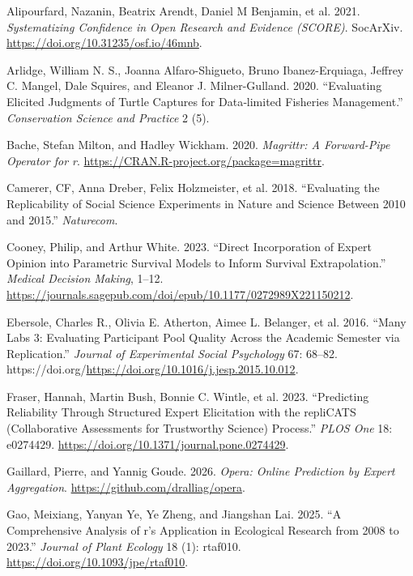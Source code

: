 \documentclass[
  11pt,
  a4paper,
]{article}
\newlength{\cslhangindent}
\newenvironment{CSLReferences}[2] %
 {\begin{list}{}{%
  \setlength{\itemindent}{0pt}
  \setlength{\leftmargin}{0pt}
  \setlength{\parsep}{0pt}
  \ifodd #1
   \setlength{\leftmargin}{\cslhangindent}
   \setlength{\itemindent}{-1\cslhangindent}
  \fi
  \setlength{\itemsep}{#2\baselineskip}}}
 {\end{list}}
\begin{document}
\protect{}\label{refs}
\begin{CSLReferences}{1}{1}
Alipourfard, Nazanin, Beatrix Arendt, Daniel M Benjamin, et al. 2021.
\emph{Systematizing Confidence in Open Research and Evidence (SCORE)}.
SocArXiv. \url{https://doi.org/10.31235/osf.io/46mnb}.

Arlidge, William N. S., Joanna Alfaro-Shigueto, Bruno Ibanez-Erquiaga,
Jeffrey C. Mangel, Dale Squires, and Eleanor J. Milner-Gulland. 2020.
{``Evaluating Elicited Judgments of Turtle Captures for Data‐limited
Fisheries Management.''} \emph{Conservation Science and Practice} 2 (5).

Bache, Stefan Milton, and Hadley Wickham. 2020. \emph{Magrittr: A
Forward-Pipe Operator for r}.
\url{https://CRAN.R-project.org/package=magrittr}.

Camerer, CF, Anna Dreber, Felix Holzmeister, et al. 2018. {``Evaluating
the Replicability of Social Science Experiments in Nature and Science
Between 2010 and 2015.''} \emph{Naturecom}.

Cooney, Philip, and Arthur White. 2023. {``Direct Incorporation of
Expert Opinion into Parametric Survival Models to Inform Survival
Extrapolation.''} \emph{Medical Decision Making}, 1--12.
\url{https://journals.sagepub.com/doi/epub/10.1177/0272989X221150212}.

{Ebersole, Charles R., Olivia E. Atherton, Aimee L. Belanger, et al.}
2016. {``Many Labs 3: Evaluating Participant Pool Quality Across the
Academic Semester via Replication.''} \emph{Journal of Experimental
Social Psychology} 67: 68--82.
https://doi.org/\url{https://doi.org/10.1016/j.jesp.2015.10.012}.

Fraser, Hannah, Martin Bush, Bonnie C. Wintle, et al. 2023.
{``Predicting Reliability Through Structured Expert Elicitation with the
repliCATS (Collaborative Assessments for Trustworthy Science)
Process.''} \emph{PLOS One} 18: e0274429.
\url{https://doi.org/10.1371/journal.pone.0274429}.

Gaillard, Pierre, and Yannig Goude. 2026. \emph{Opera: Online Prediction
by Expert Aggregation}. \url{https://github.com/dralliag/opera}.

Gao, Meixiang, Yanyan Ye, Ye Zheng, and Jiangshan Lai. 2025. {``A
Comprehensive Analysis of r{'}s Application in Ecological Research from
2008 to 2023.''} \emph{Journal of Plant Ecology} 18 (1): rtaf010.
\url{https://doi.org/10.1093/jpe/rtaf010}.


\end{CSLReferences}
\end{document}
